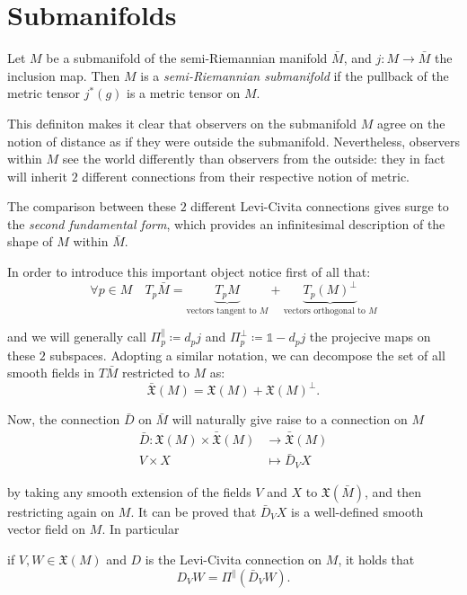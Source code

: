 \section{Submanifolds}
\label{sec:submanifolds}

\begin{definition}
	Let \(M\) be a submanifold of the semi-Riemannian manifold \(\bar{M}\), and \(j:M\rightarrow\bar{M}\) the inclusion map. Then \(M\) is a \emph{semi-Riemannian submanifold} if the pullback of the metric tensor \(j^*(g)\) is a metric tensor on \(M\).
\end{definition}

This definiton makes it clear that observers on the submanifold \(M\) agree on the notion of distance as if they were outside the submanifold. Nevertheless, observers within \(M\) see the world differently than observers from the outside: they in fact will inherit \(2\) different connections from their respective notion of metric. 

The comparison between these \(2\) different Levi-Civita connections gives surge to the \emph{second fundamental form}, which provides an infinitesimal description of the shape of \(M\) within \(\bar{M}\).

In order to introduce this important object notice first of all that:
\[
\forall p \in M \quad T_p\bar{M} = \underbrace{T_pM}_{\text{vectors tangent to }M}+ \underbrace{T_p(M)^{\perp}}_{\text{vectors orthogonal to } M}
\]

\noindent and we will generally call \(\Pi_p^{\parallel}\coloneqq d_pj\) and \(\Pi_p^{\perp}\coloneqq \mathbb{1} - d_pj\) the projecive maps on these \(2\) subspaces.
Adopting a similar notation, we can decompose the set of all smooth fields in \(T\bar{M}\) restricted to \(M\) as:
\[
\bar{\mathfrak{X}}(M) = \mathfrak{X}(M) + \mathfrak{X}(M)^{\perp}.
\]

Now, the connection \(\bar{D}\) on \(\bar{M}\) will naturally give raise to a connection on \(M\)
\begin{align*}
\bar{D} : \mathfrak{X}(M) \times \bar{\mathfrak{X}}(M) & \rightarrow \bar{\mathfrak{X}}(M) \\
	 V \times X &\mapsto \bar{D}_V X
\end{align*}

by taking any smooth extension of the fields \(V\) and \(X\) to \(\mathfrak{X}(\bar{M})\), and then restricting again on \(M\). It can be proved that \(\bar{D}_V X\) is a well-defined smooth vector field on \(M\). In particular
\begin{lemma} 
	if \(V, W \in \mathfrak{X}(M)\) and \(D\) is the Levi-Civita connection on \(M\), it holds that
	\[
	D_V W = \Pi^{\parallel}\left(\bar{D}_V W\right).
	\]
\end{lemma}


